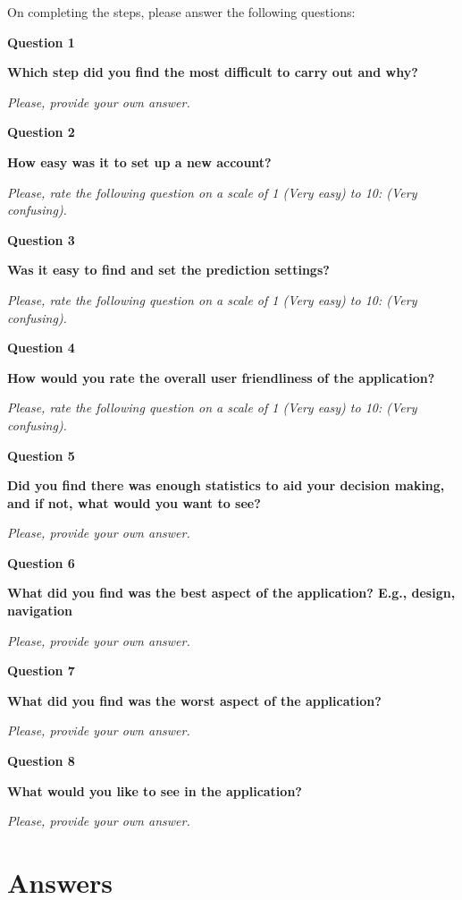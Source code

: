 On completing the steps, please answer the following questions:

\textbf{Question 1}\par
\textbf{Which step did you find the most difficult to carry out and why?}\par
\emph{Please, provide your own answer.}
 
\textbf{Question 2}\par
\textbf{How easy was it to set up a new account?}\par
\emph{Please, rate the following question on a scale of 1 (Very easy) to 10:  (Very confusing).}
 
\textbf{Question 3}\par
\textbf{Was it easy to find and set the prediction settings?}\par
 \emph{Please, rate the following question on a scale of 1 (Very easy) to 10:  (Very confusing).}
  
\textbf{Question 4}\par
\textbf{How would you rate the overall user friendliness of the application?}\par
 \emph{Please, rate the following question on a scale of 1 (Very easy) to 10:  (Very confusing). }
 
 \textbf{Question 5}\par
\textbf{Did you find there was enough statistics to aid your decision making, and if not, what would you want to see?}\par
\emph{Please, provide your own answer.}
 
 \textbf{Question 6}\par
\textbf{What did you find was the best aspect of the application? E.g., design, navigation}\par
\emph{Please, provide your own answer.}

\textbf{Question 7}\par
\textbf{What did you find was the worst aspect of the application?}\par
\emph{Please, provide your own answer.}

\textbf{Question 8}\par
\textbf{What would you like to see in the application?}\par
\emph{Please, provide your own answer.}

\section{Answers}
\label{sec:ua_answers_appendix}

